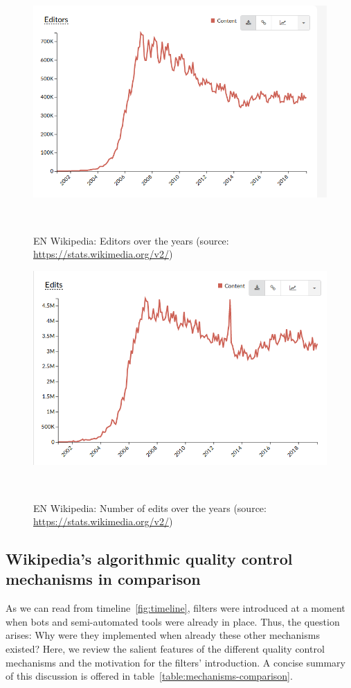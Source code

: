 \begin{figure}
\centering
  \includegraphics[width=0.9\columnwidth]{pics/editors-development.png}
    \caption{EN Wikipedia: Editors over the years (source: \url{https://stats.wikimedia.org/v2/})}~\label{fig:editors-development}
\end{figure}

\begin{figure}
\centering
    \includegraphics[width=0.9\columnwidth]{pics/edits-development.png}
    \caption{EN Wikipedia: Number of edits over the years (source: \url{https://stats.wikimedia.org/v2/})}~\label{fig:edits-development}
\end{figure}

\subsection{Wikipedia's algorithmic quality control mechanisms in comparison}

As we can read from timeline~\ref{fig:timeline}, filters were introduced at a moment when bots and semi-automated tools were already in place.
Thus, the question arises: Why were they implemented when already these other mechanisms existed?
Here, we review the salient features of the different quality control mechanisms and the motivation for the filters' introduction.
A concise summary of this discussion is offered in table~\ref{table:mechanisms-comparison}.

